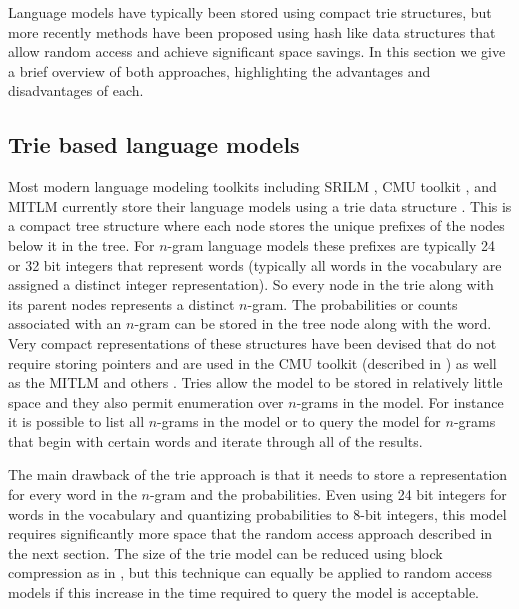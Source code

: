 \documentclass[10pt, a4paper]{article}
\begin{document}
Language models have typically been stored using compact trie structures, but more recently methods have been proposed using hash like data structures that allow random access and achieve significant space savings.  In this section we give a brief overview of both approaches, highlighting the advantages and disadvantages of each.

\subsection{Trie based language models}
Most modern language modeling toolkits including SRILM \cite{Stolcke02srilm-}, CMU toolkit \cite{cmu}, and MITLM \cite{paul} currently store their language models using a trie data structure \cite{fredkin}.  This is a compact tree structure where each node stores the unique prefixes of the nodes below it in the tree.  For $n$-gram language models these prefixes are typically 24 or 32 bit integers that represent words (typically all words in the vocabulary are assigned a distinct integer representation).  So every  node in the trie along with its parent nodes represents a distinct $n$-gram.  The probabilities or counts associated with an $n$-gram can be stored in the tree node along with the word.  Very compact representations of these structures have been devised that do not require storing pointers and are used in the CMU toolkit (described in ) as well as the MITLM and others \cite{harb,joanis}.  Tries allow the model to be stored in relatively little space and they also permit enumeration over $n$-grams in the model.  For instance it is possible to list all $n$-grams in the model or to query the model for $n$-grams that begin with certain words and iterate through all of the results.  

The main drawback of the trie approach is that it needs to store a representation for every word in the $n$-gram and the probabilities.  Even using 24 bit integers for words in the vocabulary and quantizing probabilities to 8-bit integers, this model requires significantly more space that the random access approach described in the next section.  The size of the trie model can be reduced using block compression as in , but this technique can equally be applied to random access models if this increase in the time required to query the model is acceptable.
\end{document}
